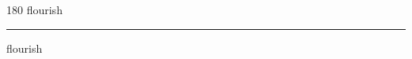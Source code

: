 
\begin{frame}
\begin{center}
\begin{turn}{180}
{\fontsize{2.5cm}{1em}\selectfont flourish}
\end{turn}
\vspace{1em}\par  
\hrule
\vspace{1em}\par  
{\fontsize{2.5cm}{1em}\selectfont flourish}
\end{center}
\end{frame}
